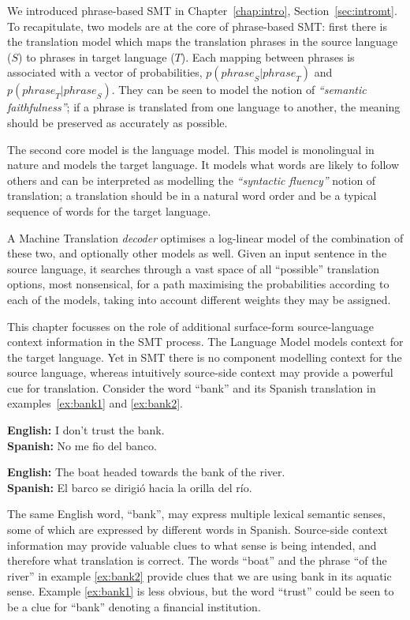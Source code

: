 We introduced phrase-based SMT in Chapter~\ref{chap:intro},
Section~\ref{sec:intromt}. To recapitulate, two models are at the core of
phrase-based SMT: first there is the translation model which maps the
translation phrases in the source language ($S$) to phrases in target language
($T$). Each mapping between phrases is associated with a vector of
probabilities, $p({phrase}_S|{phrase}_T)$ and $p({phrase}_T|{phrase}_S)$. They
can be seen to model the notion of \emph{``semantic faithfulness''}; if a
phrase is translated from one language to another, the meaning should be
preserved as accurately as possible.

The second core model is the language model. This model is monolingual
in nature and models the target language. It models what words are
likely to follow others and can be interpreted as modelling the
\emph{``syntactic fluency''} notion of translation; a translation should be
in a natural word order and be a typical sequence of words for the
target language.

A Machine Translation \emph{decoder} optimises a log-linear model of the
combination of these two, and optionally other models as well. Given an input
sentence in the source language, it searches through a vast space of all
``possible'' translation options, most nonsensical, for a path maximising the
probabilities according to each of the models, taking into account different
weights they may be assigned.

This chapter focusses on the role of additional
surface-form source-language context information in the SMT process. The Language Model models context
for the target language. Yet in SMT there is no component modelling
context for the source language, whereas intuitively source-side context may
provide a powerful cue for translation. Consider the word ``bank'' and its
Spanish translation in examples~\ref{ex:bank1} and \ref{ex:bank2}.

\begin{exe} %
\ex \textbf{English:} I don't trust the bank. \\
    \textbf{Spanish:} No me fio del banco.
\label{ex:bank1}

\ex \textbf{English:} The boat headed towards the bank of the river. \\
    \textbf{Spanish:} El barco se dirigió hacia la orilla del río.
\label{ex:bank2}
\end{exe}

The same English word, ``bank'', may express multiple lexical semantic senses, some of
which are expressed by different words in Spanish. Source-side context
information may provide valuable clues to what sense is being intended, and
therefore what translation is correct.  The words ``boat'' and the phrase ``of
the river'' in example \ref{ex:bank2} provide clues that we are using
bank in its aquatic sense. Example \ref{ex:bank1} is less obvious, but the
word ``trust'' could be seen to be a clue for ``bank'' denoting a
financial institution.

